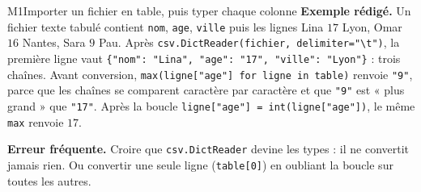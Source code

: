 \begin{fichemethode}{M1}{Importer un fichier en table, puis typer chaque colonne}
\textbf{Exemple rédigé.} Un fichier texte tabulé contient
\lstinline{nom}, \lstinline{age}, \lstinline{ville} puis les lignes Lina $17$ Lyon,
Omar $16$ Nantes, Sara $9$ Pau. Après
\lstinline{csv.DictReader(fichier, delimiter="\t")}, la première ligne vaut
\lstinline|{"nom": "Lina", "age": "17", "ville": "Lyon"}| : trois chaînes. Avant conversion,
\lstinline{max(ligne["age"] for ligne in table)} renvoie \lstinline{"9"}, parce que les
chaînes se comparent caractère par caractère et que \lstinline{"9"} est « plus grand » que
\lstinline{"17"}. Après la boucle \lstinline{ligne["age"] = int(ligne["age"])}, le même
\lstinline{max} renvoie $17$.

\textbf{Erreur fréquente.} Croire que \lstinline{csv.DictReader} devine les types : il ne
convertit jamais rien. Ou convertir une seule ligne (\lstinline{table[0]}) en oubliant la
boucle sur toutes les autres.

\end{fichemethode}
